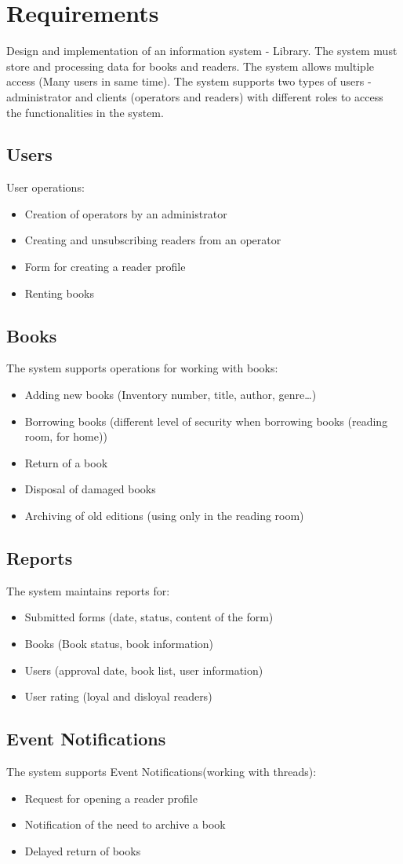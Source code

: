 \section{Requirements}
Design and implementation of an information system - Library. The system must store and processing data for books and readers. The system allows multiple access (Many users in same time). The system supports two types of users - administrator and clients (operators and readers) with different roles to access the functionalities in the system.

\subsection{Users}
User operations:
\begin{itemize}
    \item Creation of operators by an administrator
    \item Creating and unsubscribing readers from an operator
    \item Form for creating a reader profile
    \item Renting books
\end{itemize}

\subsection{Books}
The system supports operations for working with books:
\begin{itemize}
    \item Adding new books (Inventory number, title, author, genre…)
    \item Borrowing books (different level of security when borrowing books (reading room, for home))
    \item Return of a book
    \item Disposal of damaged books
    \item Archiving of old editions (using only in the reading room)
\end{itemize}

\subsection{Reports}
The system maintains reports for:
\begin{itemize}
    \item Submitted forms (date, status, content of the form)
    \item Books (Book status, book information)
    \item Users (approval date, book list, user information)
    \item User rating (loyal and disloyal readers)
\end{itemize}

\subsection{Event Notifications}
The system supports Event Notifications(working with threads):
\begin{itemize}
    \item Request for opening a reader profile
    \item Notification of the need to archive a book
    \item Delayed return of books
\end{itemize}

